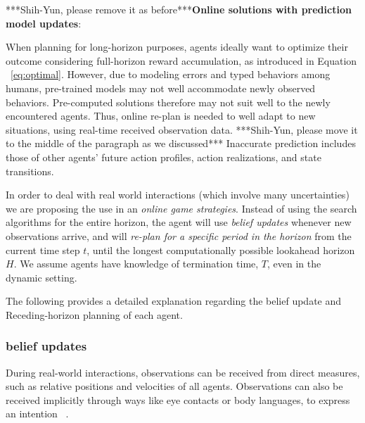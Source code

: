 \documentclass[letterpaper, 10 pt, conference]{ieeeconf}  %
\begin{document}

***Shih-Yun, please remove it as before***\textbf{Online solutions with prediction model updates}:

When planning for long-horizon purposes, agents ideally want to optimize their 
outcome considering full-horizon reward accumulation, as introduced in Equation 
~\ref{eq:optimal}. However, due to modeling errors and typed behaviors among 
humans, pre-trained models may not well accommodate newly observed behaviors. 
Pre-computed solutions therefore may not suit well to the newly 
encountered agents. Thus, online re-plan is needed to well adapt to new 
situations, using real-time received observation data. 
***Shih-Yun, please move it to the middle of the paragraph as we discussed*** Inaccurate prediction includes those of other agents' future action profiles, action realizations, and state transitions. 

In order to deal with real world interactions (which involve many uncertainties) we are proposing the use in an \textit{online game 
strategies}. Instead of using the search algorithms for the entire 
horizon, the agent will use \textit{belief updates} whenever new 
observations arrive, and will \textit{re-plan for a specific period in the horizon} from the current time step $t$, until the longest computationally possible lookahead horizon $H$. We assume agents have knowledge of termination time, $T$, even in the dynamic setting.

The following provides a detailed explanation regarding the belief update and 
Receding-horizon planning of each agent.
 
\subsubsection{belief updates}\label{sec:belief_update}
During real-world interactions, observations can be received from direct measures, such as relative positions and velocities of all agents. Observations can also be received implicitly through ways like eye contacts or body languages, to express an intention ~\cite{knepper2017implicit}.
\end{document}
